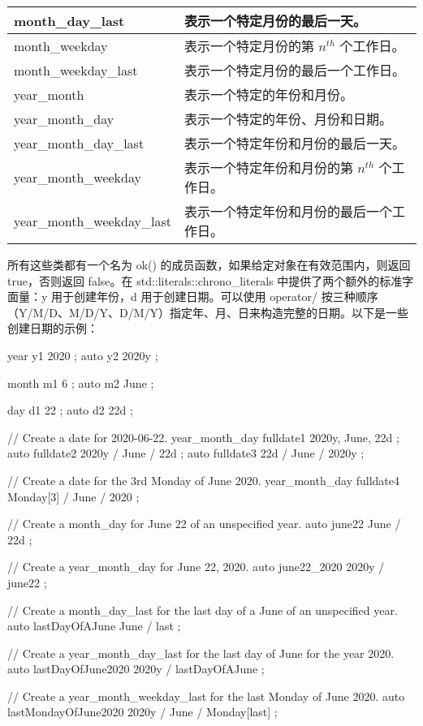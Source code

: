 \begin{longtable}{|l|l|}
month\_day\_last &
表示一个特定月份的最后一天。 \\ \hline
month\_weekday &
表示一个特定月份的第 $n^{th}$ 个工作日。 \\ \hline
month\_weekday\_last &
表示一个特定月份的最后一个工作日。 \\ \hline
year\_month &
表示一个特定的年份和月份。 \\ \hline
year\_month\_day &
表示一个特定的年份、月份和日期。 \\ \hline
year\_month\_day\_last &
表示一个特定年份和月份的最后一天。 \\ \hline
year\_month\_weekday &
表示一个特定年份和月份的第 $n^{th}$ 个工作日。 \\ \hline
year\_month\_weekday\_last &
表示一个特定年份和月份的最后一个工作日。 \\ \hline
\end{longtable}

所有这些类都有一个名为 ok() 的成员函数，如果给定对象在有效范围内，则返回 true，否则返回 false。在 std::literals::chrono\_literals 中提供了两个额外的标准字面量：y 用于创建年份，d 用于创建日期。可以使用 operator/ 按三种顺序（Y/M/D、M/D/Y、D/M/Y）指定年、月、日来构造完整的日期。以下是一些创建日期的示例：

\begin{cpp}
year y1 { 2020 };
auto y2 { 2020y };

month m1 { 6 };
auto m2 { June };

day d1 { 22 };
auto d2 { 22d };

// Create a date for 2020-06-22.
year_month_day fulldate1 { 2020y, June, 22d };
auto fulldate2 { 2020y / June / 22d };
auto fulldate3 { 22d / June / 2020y };

// Create a date for the 3rd Monday of June 2020.
year_month_day fulldate4 { Monday[3] / June / 2020 };

// Create a month_day for June 22 of an unspecified year.
auto june22 { June / 22d };

// Create a year_month_day for June 22, 2020.
auto june22_2020 { 2020y / june22 };

// Create a month_day_last for the last day of a June of an unspecified year.
auto lastDayOfAJune { June / last };

// Create a year_month_day_last for the last day of June for the year 2020.
auto lastDayOfJune2020 { 2020y / lastDayOfAJune };

// Create a year_month_weekday_last for the last Monday of June 2020.
auto lastMondayOfJune2020 { 2020y / June / Monday[last] };
\end{cpp}

